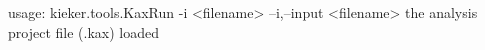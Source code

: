 usage: kieker.tools.KaxRun -i <filename>
 --i,--input <filename>
        the analysis project file (.kax) loaded
